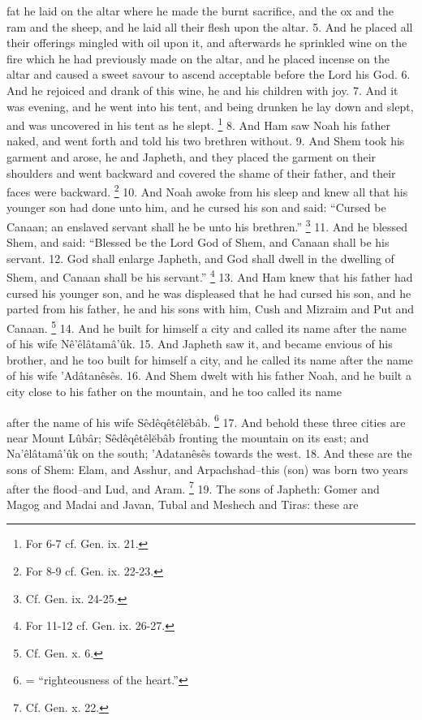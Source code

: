 fat he laid on the altar where he made the burnt sacrifice, and the ox and the ram and the sheep, and he laid all their flesh upon the altar. 5. And he placed all their offerings mingled with oil upon it, and afterwards he sprinkled wine on the fire which he had previously made on the altar, and he placed incense on the altar and caused a sweet savour to ascend acceptable before the Lord his God. 6. And he rejoiced and drank of this wine, he and his children with joy. 7. And it was evening, and he went into his tent, and being drunken he lay down and slept, and was uncovered in his tent as he slept. \footnote{For 6-7 cf. Gen. ix. 21.} 8. And Ham saw Noah his father naked, and went forth and told his two brethren without. 9. And Shem took his garment and arose, he and Japheth, and they placed the garment on their shoulders and went backward and covered the shame of their father, and their faces were backward. \footnote{For 8-9 cf. Gen. ix. 22-23.} 10. And Noah awoke from his sleep and knew all that his younger son had done unto him, and he cursed his son and said: ``Cursed be Canaan; an enslaved servant shall he be unto his brethren.'' \footnote{Cf. Gen. ix. 24-25.} 11. And he blessed Shem, and said: ``Blessed be the Lord God of Shem, and Canaan shall be his servant. 12. God shall enlarge Japheth, and God shall dwell in the dwelling of Shem, and Canaan shall be his servant.'' \footnote{For 11-12 cf. Gen. ix. 26-27.} 13. And Ham knew that his father had cursed his younger son, and he was displeased that he had cursed his son, and he parted from his father, he and his sons with him, Cush and Mizraim and Put and Canaan. \footnote{Cf. Gen. x. 6.} 14. And he built for himself a city and called its name after the name of his wife Nê’êlâtamâ’ûk. 15. And Japheth saw it, and became envious of his brother, and he too built for himself a city, and he called its name after the name of his wife ’Adâtanêsês. 16. And Shem dwelt with his father Noah, and he built a city close to his father on the mountain, and he too called its name

after the name of his wife Sêdêqêtêlĕbâb. \footnote{= ``righteousness of the heart.''} 17. And behold these three cities are near Mount Lûbâr; Sêdêqêtêlĕbâb fronting the mountain on its east; and Na’êlâtamâ’ûk on the south; ’Adatanêsês towards the west. 18. And these are the sons of Shem: Elam, and Asshur, and Arpachshad--this (son) was born two years after the flood--and Lud, and Aram. \footnote{Cf. Gen. x. 22.} 19. The sons of Japheth: Gomer and Magog and Madai and Javan, Tubal and Meshech and Tiras: these are

